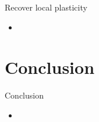 \documentclass[aspectratio=43]{beamer}
\begin{document}
\begin{frame}{Recover local plasticity}
  \begin{itemize}
    \item %
  \end{itemize}
\end{frame}




\section{Conclusion}
\begin{frame}{Conclusion}
  \begin{itemize}
    \item %
  \end{itemize}
\end{frame}
\end{document}
